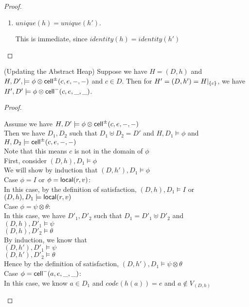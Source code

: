 \begin{proof}
\begin{enumerate}
\item $\mathit{unique}(h) = \mathit{unique}(h')$.

This is immediate, since $\mathit{identity}(h) = \mathit{identity}(h')$ 
\end{enumerate}
\end{proof}


\begin{lemma}{(Updating the Abstract Heap)}
Suppose we have $H = (D,h)$ and $H, D', \models \phi \otimes
\mathsf{cell}^{\pm}({c}, {e}, {-}, {-})$ and $c \in D$. Then for $H' = (D, h') = H|_{\{{c}\}}$, we
have $H', D' \models \phi \otimes \mathsf{cell}^{-}({c}, {e}, {\_}, {\_})$.
\end{lemma}

\begin{proof}
\begin{tabbedproof}
\oo Assume we have $H, D' \models \phi \otimes \mathsf{cell}^{\pm}({c}, {e}, {-}, {-})$ \\
\oo Then we have $D_1, D_2$ such that $D_1 \uplus D_2 = D'$ and $H, D_1 \models \phi$ and $H, D_2 \models \mathsf{cell}^{\pm}({c}, {e}, {-}, {-})$ \\
\oo Note that this means $c$ is not in the domain of $\phi$ \\
\oo First, consider $(D,h), D_1 \models \phi$ \\
\ooo We will show by induction that $(D,h'), D_1 \models \phi$ \\
\ooo Case $\phi = I$ or $\phi = \mathsf{local}({r}, {v})$: \\
\oooo In this case, by the definition of satisfaction, $(D,h), D_1 \models I$ or $(D,h), D_1 \models \mathsf{local}({r}, {v})$\\
\ooo Case $\phi = \psi \otimes \theta$: \\
\oooo In this case, we have $D'_1, D'_2$ such that $D_1 = D'_1 \uplus D'_2$ and \\
\oooox $(D,h), D'_1 \models \psi$ \\
\oooox $(D,h), D'_2 \models \theta$ \\
\oooo By induction, we know that \\
\oooox $(D,h'), D'_1 \models \psi$ \\
\oooox $(D,h'), D'_2 \models \theta$ \\
\oooo Hence by the definition of satisfaction, $(D,h'), D_1 \models \psi \otimes \theta$ \\
\ooo Case $\phi = \mathsf{cell}^{-}({a}, {e}, {\_}, {\_})$: \\
\oooo In this case, we know $a \in D_1$ and $\mathit{code}(h(a)) = e$ and $a \not\in V_{(D,h)}$ \\

\end{tabbedproof}
\end{proof}
